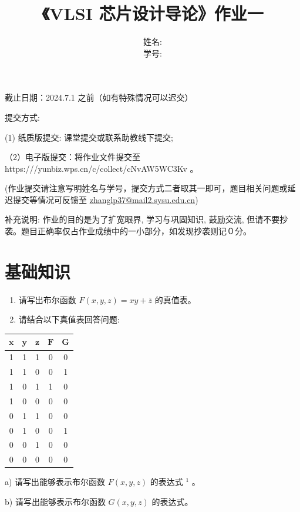 \documentclass[10pt]{article}
\title{《VLSI 芯片设计导论》作业一 }
\author{姓名:\\
学号:}
\date{}
\begin{document}
\maketitle
截止日期：2024.7.1 之前（如有特殊情况可以迟交）

提交方式:

(1) 纸质版提交: 课堂提交或联系助教线下提交;

（2）电子版提交：将作业文件提交至https:///yunbiz.wps.cn/c/collect/cNvAW5WC3Kv 。

(作业提交请注意写明姓名与学号，提交方式二者取其一即可，题目相关问题或延迟提交等情况可反馈至 \href{mailto:zhanglp37@mail2.sysu.edu.cn}{zhanglp37@mail2.sysu.edu.cn})

补充说明: 作业的目的是为了扩宽眼界, 学习与巩固知识, 鼓励交流, 但请不要抄袭。题目正确率仅占作业成绩中的一小部分，如发现抄袭则记０分。

\section*{基础知识}
\begin{enumerate}
  \item 请写出布尔函数 $F(x, y, z)=x y+\bar{z}$ 的真值表。

  \item 请结合以下真值表回答问题:

\end{enumerate}

\begin{center}
\begin{tabular}{|c|c|c|c|c|}
\hline
$\boldsymbol{x}$ & $\boldsymbol{y}$ & $\boldsymbol{z}$ & $\boldsymbol{F}$ & $\boldsymbol{G}$ \\
\hline
1 & 1 & 1 & 0 & 0 \\
\hline
1 & 1 & 0 & 0 & 1 \\
\hline
1 & 0 & 1 & 1 & 0 \\
\hline
1 & 0 & 0 & 0 & 0 \\
\hline
0 & 1 & 1 & 0 & 0 \\
\hline
0 & 1 & 0 & 0 & 1 \\
\hline
0 & 0 & 1 & 0 & 0 \\
\hline
0 & 0 & 0 & 0 & 0 \\
\hline
\end{tabular}
\end{center}

a) 请写出能够表示布尔函数 $F(x, y, z)$ 的表达式 ${ }^{1}$ 。

b) 请写出能够表示布尔函数 $G(x, y, z)$ 的表达式。
\end{document}
